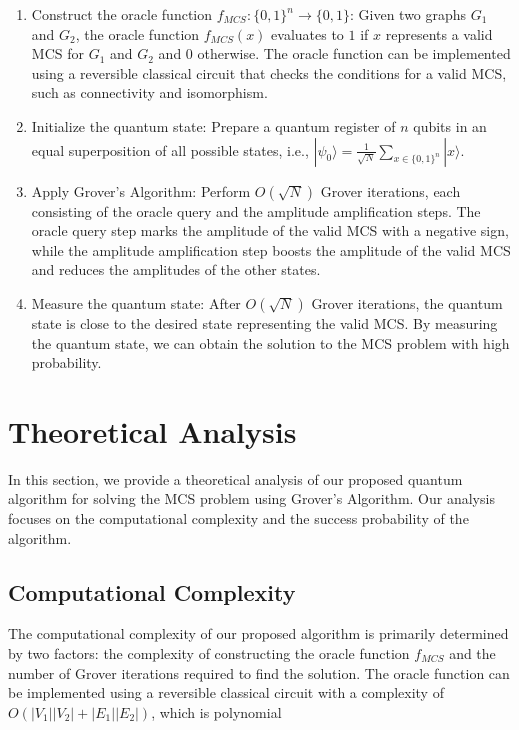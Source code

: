 \begin{enumerate}
    \item Construct the oracle function $f_{MCS}: \{0, 1\}^n \rightarrow \{0, 1\}$: Given two graphs $G_1$ and $G_2$, the oracle function $f_{MCS}(x)$ evaluates to $1$ if $x$ represents a valid MCS for $G_1$ and $G_2$ and $0$ otherwise. The oracle function can be implemented using a reversible classical circuit that checks the conditions for a valid MCS, such as connectivity and isomorphism.
    
    \item Initialize the quantum state: Prepare a quantum register of $n$ qubits in an equal superposition of all possible states, i.e., $|\psi_0\rangle = \frac{1}{\sqrt{N}}\sum_{x \in \{0, 1\}^n} |x\rangle$.
    
    \item Apply Grover's Algorithm: Perform $O(\sqrt{N})$ Grover iterations, each consisting of the oracle query and the amplitude amplification steps. The oracle query step marks the amplitude of the valid MCS with a negative sign, while the amplitude amplification step boosts the amplitude of the valid MCS and reduces the amplitudes of the other states.
    
    \item Measure the quantum state: After $O(\sqrt{N})$ Grover iterations, the quantum state is close to the desired state representing the valid MCS. By measuring the quantum state, we can obtain the solution to the MCS problem with high probability.
\end{enumerate}

\section{Theoretical Analysis} \label{sec:theoretical_analysis}

In this section, we provide a theoretical analysis of our proposed quantum algorithm for solving the MCS problem using Grover's Algorithm. Our analysis focuses on the computational complexity and the success probability of the algorithm.

\subsection{Computational Complexity}

The computational complexity of our proposed algorithm is primarily determined by two factors: the complexity of constructing the oracle function $f_{MCS}$ and the number of Grover iterations required to find the solution. The oracle function can be implemented using a reversible classical circuit with a complexity of $O(|V_1||V_2|+|E_1||E_2|)$, which is polynomial

